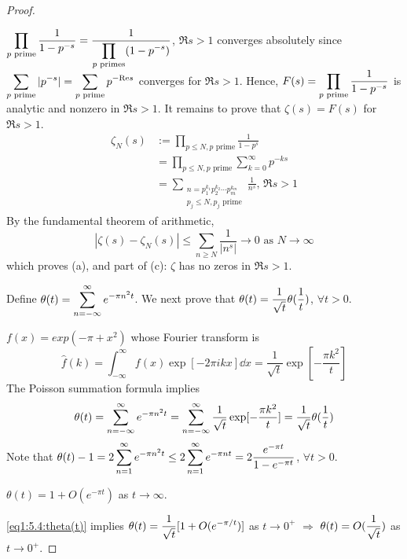 \begin{proof}\,

    $ \displaystyle\prod_{p\text{ prime}}\frac{1}{1-p^{-s}}=\frac{1}{\displaystyle \prod_{p\text{ primes}}(1-p^{-s})} $,  $ \Re s>1 $ converges absolutely since  $ \displaystyle\sum_{p\text{ prime}}|p^{-s}|=\sum_{p\text{ prime}}p^{-\mathrm{Re} s} $ converges for  $ \Re s>1 $. Hence,  $ F(s)=\displaystyle\prod_{p\text{ prime}}\frac{1}{1-p^{-s}} $ is analytic and nonzero in  $ \Re s>1 $. It remains to prove that  $ \zeta(s)=F(s) $ for  $ \Re s>1 $.
    \begin{align*}
        \zeta_N(s)&:=\prod_{p \leq N,p\text{ prime}}\frac{1}{1-p^s}\\
        &=\prod_{p \leq N,p\text{ prime}}\sum_{k=0}^\infty p^{-ks}\\
        &=\sum_{\substack{n=p_1^{k_1}p_2^{k_2}\cdots p_m^{k_m}\\p_j \leq N,p_j\text{ prime}}}\frac{1}{n^s},\,\Re s>1
    \end{align*}  
    By the fundamental theorem of arithmetic, 
    \[|\zeta(s)-\zeta_N(s)| \leq \sum_{n \geq N}\frac{1}{|n^s|}\rightarrow 0\text{ as }N\rightarrow \infty\]
    which proves (a), and part of (c):  $ \zeta  $ has no zeros in  $ \Re s>1 $.
    
    Define  $ \displaystyle\theta(t)=\sum_{n=-\infty}^\infty e^{-\pi n^2t} $. We next prove that  $ \theta(t)=\displaystyle\frac{1}{\sqrt{t}}\theta(\frac{1}{t}) $,  $ \forall t>0 $.
    
    $ f(x)=exp(-\pi +x^2) $ whose Fourier transform is 
    \[\hat{f}(k)=\int_{-\infty}^\infty f(x)\exp[-2\pi i kx]\dd x=\frac{1}{\sqrt{t}}\exp[-\frac{\pi k^2}{t}]\]
    The Poisson summation formula implies  \begin{equation}\label{eq1:5.4:theta(t)}
        \theta(t)=\displaystyle\sum_{n=-\infty}^\infty e^{-\pi n^2t}=\sum_{n=-\infty}^\infty \frac{1}{\sqrt{t}}\exp[-\frac{\pi k^2}{t}]=\frac{1}{\sqrt{t}}\theta(\frac{1}{t})
    \end{equation} 
    Note that  $ \theta(t)-1=2\displaystyle\sum_{n=1}^\infty e^{-\pi n^2 t} \leq 2\sum_{n=1}^\infty e^{-\pi nt}=2\frac{e^{-\pi t}}{1-e^{-\pi t}} $,  $ \forall t>0 $.

    \ie  $ \theta(t)=1+O(e^{-\pi t}) $   as  $ t\rightarrow \infty  $.
    
    \eqref{eq1:5.4:theta(t)} implies  $ \displaystyle\theta(t)=\frac{1}{\sqrt{t}}[1+O(e^{-\pi/t})] $ as  $ t\rightarrow 0^+ $ $ \Rightarrow  $  $ \displaystyle\theta(t)=O(\frac{1}{\sqrt{t}}) $  as  $ t\rightarrow 0^+ $.
    

\end{proof}
